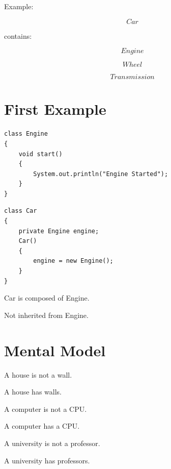 \documentclass[11pt,a4paper]{book}
\begin{document}
Example:

\[
Car
\]

contains:

\[
Engine
\]


\[
Wheel
\]


\[
Transmission
\]


\section{First Example}

\begin{verbatim}
class Engine
{
    void start()
    {
        System.out.println("Engine Started");
    }
}
\end{verbatim}


\begin{verbatim}
class Car
{
    private Engine engine;
    Car()
    {
        engine = new Engine();
    }
}
\end{verbatim}


Car is composed of Engine.


Not inherited from Engine.


\section{Mental Model}

\begin{mentalmodel}

A house is not a wall.

A house has walls.


A computer is not a CPU.

A computer has a CPU.


A university is not a professor.

A university has professors.

\end{mentalmodel}
\end{document}
